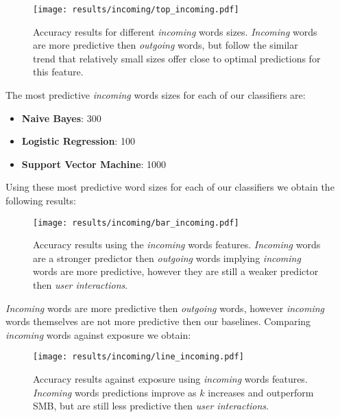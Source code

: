 \begin{figure}[h]
	\begin{center}
		\texttt{[image: results/incoming/top\_incoming.pdf]}
		\caption{Accuracy results for different \emph{incoming} words sizes. \emph{Incoming} words are more predictive then \emph{outgoing} words, but follow
				 the similar trend that relatively small sizes offer close to optimal predictions for this feature.}
	\end{center}
\end{figure}

\clearpage

The most predictive \emph{incoming} words sizes for each of our classifiers are:
\begin{itemize}
\item \textbf{Naive Bayes}: 300
\item \textbf{Logistic Regression}: 100
\item \textbf{Support Vector Machine}: 1000
\end{itemize}

Using these most predictive word sizes for each of our classifiers we obtain the following results:

\begin{figure}[h]
	\begin{center}
		\texttt{[image: results/incoming/bar\_incoming.pdf]}
		\caption{Accuracy results using the \emph{incoming} words features. \emph{Incoming} words are a 
				 stronger predictor then \emph{outgoing} words implying \emph{incoming} words are more predictive, however they are still a weaker predictor then \emph{user interactions}.}
	\end{center}
\end{figure}

\emph{Incoming} words are more predictive then \emph{outgoing} words, however \emph{incoming} words themselves are not more predictive then our baselines.
Comparing \emph{incoming} words against exposure we obtain:

\begin{figure}[h]
	\begin{center}
		\texttt{[image: results/incoming/line\_incoming.pdf]}
		\caption{Accuracy results against exposure using \emph{incoming} words features. 
				 \emph{Incoming} words predictions improve as $k$ increases and outperform SMB, but are still less predictive then \emph{user interactions}.
		}
	\end{center}
\end{figure}

